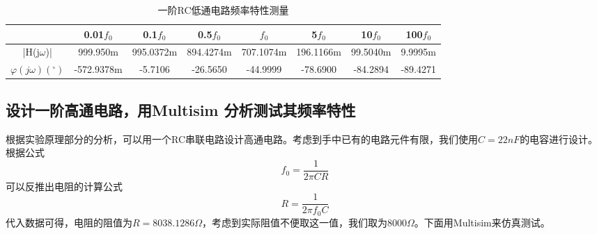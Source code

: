 \documentclass{ctexart}
\begin{document}
\begin{table}[h]
    \centering
    \begin{tabular}{|c|c|c|c|c|c|c|c|}
        \hline
        ~ & 0.01$f_0$ &  0.1$f_0$ & 0.5$f_0$ & $f_0$ & 5$f_0$ & 10$f_0$ & 100$f_0$ \\ \hline
        |H(j$\omega$)| & 999.950m & 995.0372m & 894.4274m & 707.1074m & 196.1166m &99.5040m & 9.9995m \\ \hline
        $\varphi(j\omega)({}^\circ)$ & -572.9378m& -5.7106 & -26.5650 & -44.9999 & -78.6900 & -84.2894 & -89.4271  \\ 
        \hline
        
    \end{tabular}
    \caption{一阶RC低通电路频率特性测量}
    \label{tab:一阶RC低通电路频率特性测量}
\end{table}
\subsection{设计一阶高通电路，用Multisim 分析测试其频率特性}
根据实验原理部分的分析，可以用一个RC串联电路设计高通电路。考虑到手中已有的电路元件有限，我们使用$C=22nF$的电容进行设计。
根据公式
\begin{equation}
    f_0=\dfrac{1}{2 \pi CR}
\end{equation}
可以反推出电阻的计算公式
\begin{equation}
    R=\dfrac{1}{2 \pi f_0 C}
\end{equation}
代入数据可得，电阻的阻值为$R=8038.1286\Omega$，考虑到实际阻值不便取这一值，我们取为8000$\Omega$。下面用Multisim来仿真测试。
\end{document}
